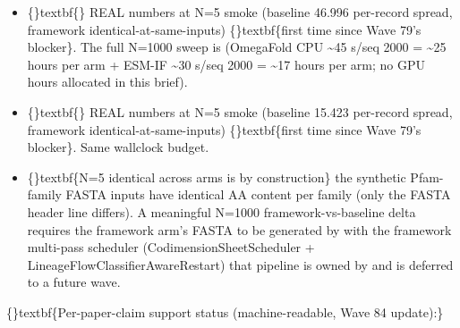 \documentclass{article}
\begin{document}
\begin{itemize}
\item \{\}textbf\{\} REAL numbers at N=5 smoke (baseline 46.996  per-record spread, framework identical-at-same-inputs)  \{\}textbf\{first time since Wave 79's  blocker\}. The full N=1000 sweep is  (OmegaFold CPU \textasciitilde{}45 s/seq  2000 = \textasciitilde{}25 hours per arm + ESM-IF \textasciitilde{}30 s/seq  2000 = \textasciitilde{}17 hours per arm; no GPU hours allocated in this brief).
\item \{\}textbf\{\} REAL numbers at N=5 smoke (baseline 15.423  per-record spread, framework identical-at-same-inputs)  \{\}textbf\{first time since Wave 79's  blocker\}. Same wallclock budget.
\item \{\}textbf\{N=5 identical across arms is by construction\}  the synthetic Pfam-family FASTA inputs have identical AA content per family (only the FASTA header line differs). A meaningful N=1000 framework-vs-baseline delta requires the framework arm's FASTA to be generated by  with the framework multi-pass scheduler (CodimensionSheetScheduler + LineageFlowClassifierAwareRestart)  that pipeline is owned by  and is deferred to a future wave.
\end{itemize}
\{\}textbf\{Per-paper-claim support status (machine-readable, Wave 84 update):\}
\end{document}
